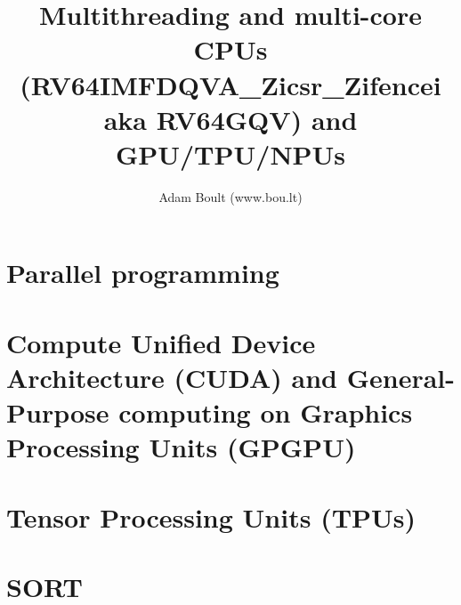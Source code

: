 \documentclass[oneside]{book}
\begin{document}
\author{Adam Boult (www.bou.lt)}
\title{Multithreading and multi-core CPUs (RV64IMFDQVA\_Zicsr\_Zifencei aka RV64GQV) and GPU/TPU/NPUs}
\maketitle

\setcounter{tocdepth}{0}
\tableofcontents



\part{Parallel programming}


\part{Compute Unified Device Architecture (CUDA) and General-Purpose computing on Graphics Processing Units (GPGPU)}

\part{Tensor Processing Units (TPUs)}

\part{SORT}

\end{document}
